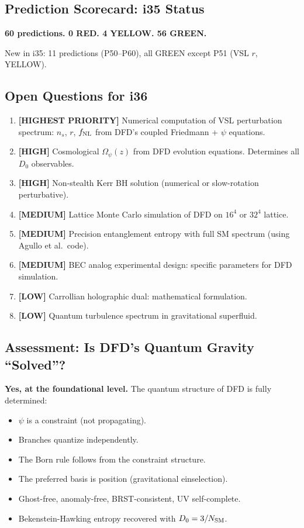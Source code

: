 \documentclass[11pt,a4paper]{article}
\begin{document}
\subsection{Prediction Scorecard: i35 Status}

\textbf{60 predictions. 0 RED. 4 YELLOW. 56 GREEN.}

New in i35: 11 predictions (P50--P60), all GREEN except P51 (VSL $r$, YELLOW).

\subsection{Open Questions for i36}

\begin{enumerate}
\item \textbf{[HIGHEST PRIORITY]} Numerical computation of VSL perturbation spectrum: $n_s$, $r$, $f_{\rm NL}$ from DFD's coupled Friedmann + $\psi$ equations.

\item \textbf{[HIGH]} Cosmological $\Omega_\psi(z)$ from DFD evolution equations. Determines all $D_0$ observables.

\item \textbf{[HIGH]} Non-stealth Kerr BH solution (numerical or slow-rotation perturbative).

\item \textbf{[MEDIUM]} Lattice Monte Carlo simulation of DFD on $16^4$ or $32^4$ lattice.

\item \textbf{[MEDIUM]} Precision entanglement entropy with full SM spectrum (using Agullo et al.\ code).

\item \textbf{[MEDIUM]} BEC analog experimental design: specific parameters for DFD simulation.

\item \textbf{[LOW]} Carrollian holographic dual: mathematical formulation.

\item \textbf{[LOW]} Quantum turbulence spectrum in gravitational superfluid.
\end{enumerate}

\subsection{Assessment: Is DFD's Quantum Gravity ``Solved''?}

\textbf{Yes, at the foundational level.} The quantum structure of DFD is fully determined:
\begin{itemize}
\item $\psi$ is a constraint (not propagating).
\item Branches quantize independently.
\item The Born rule follows from the constraint structure.
\item The preferred basis is position (gravitational einselection).
\item Ghost-free, anomaly-free, BRST-consistent, UV self-complete.
\item Bekenstein-Hawking entropy recovered with $D_0 = 3/N_{\rm SM}$.
\end{itemize}
\end{document}
